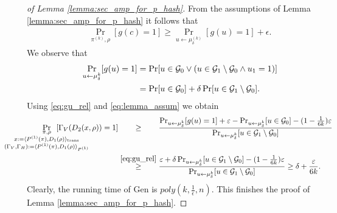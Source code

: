 \begin{proof}[of Lemma \ref{lemma:sec_amp_for_p_hash}]
 From the assumptions of Lemma \ref{lemma:sec_amp_for_p_hash} it follows that
 \begin{align}
   \label{eq:lemma_assum}
   \Pr_{\pi^{(k)}, \rho} [g(c) = 1] \geq \Pr_{u \leftarrow \mu_{\delta}^{(k)}}[g(u) = 1] + \epsilon.
 \end{align}
We observe that
\begin{align}
  \label{eq:gu_rel}
\underset{u \leftarrow \mu_{\delta}^k}{\Pr}[g(u) = 1]
&= \Pr[u \in \mathcal{G}_0 \lor ( u \in \mathcal{G}_1 \setminus \mathcal{G}_0 \land u_1 = 1)] \notag\\
&= \Pr[u \in \mathcal{G}_0] + \delta \Pr[u \in \mathcal{G}_1 \setminus \mathcal{G}_0].
\end{align}
 Using \eqref{eq:gu_rel} and \eqref{eq:lemma_assum} we obtain
 \begin{align}
   \label{eq:proof_final}
   \IndI
\underset{
  \mathclap{
  \substack{\pi, \rho \\ x := \langle P^{(1)}(\pi), D_1(\rho) \rangle_{\text{trans}}
    \\ (\Gamma_V, \Gamma_H) := \langle P^{(1)}(\pi), D_1 (\rho) \rangle_{P^{(1)}} }}}
{\Pr}\mkern13mu[\Gamma_V(D_2(x, \rho)) = 1]
 &\stackrel{\hphantom{\eqref{eq:gu_rel}}}{\geq} \frac{ {\Pr}_{u \leftarrow \mu_{\delta}^{k}}[g(u) = 1] + \epsilon -
 \Pr_{u \leftarrow \mu_{\delta}^{k}}[u \in \cG_0] - (1 - \frac{1}{6k})\epsilon} {\Pr_{u \leftarrow \mu_{\delta}^{k}}[u \in \cG_1 \setminus \cG_0]} \notag\\
 &\stackrel{\eqref{eq:gu_rel}}{\geq} \frac{\epsilon + \delta\Pr_{u \leftarrow \mu_{\delta}^{k}}[u \in \cG_1 \setminus \cG_0] - (1 - \frac{1}{6k})\epsilon}
{\Pr_{u \leftarrow \mu_{\delta}^{k}}[u \in \cG_1 \setminus \cG_0]} \geq \delta + \frac{\epsilon}{6k}.
\end{align}
Clearly, the running time of Gen is $poly(k, \frac{1}{\epsilon}, n)$.
This finishes the proof of Lemma \ref{lemma:sec_amp_for_p_hash}.
\end{proof}

%
